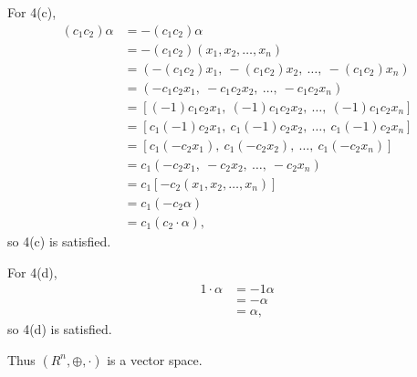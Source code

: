 \documentclass[12pt]{article}
\begin{document}
\begin{enumerate}
    For 4(c),
    \begin{align*}
      (c_1c_2)\alpha &= -(c_1c_2)\alpha\\
                     &= -(c_1c_2)(x_1,x_2,\ldots,x_n)\\
                     &= (-(c_1c_2)x_1,\ -(c_1c_2)x_2,\ \ldots,\ -(c_1c_2)x_n)\\
                     &= (-c_1c_2x_1,\ -c_1c_2x_2,\ \ldots,\ -c_1c_2x_n)\\
                     &= [(-1)c_1c_2x_1,\ (-1)c_1c_2x_2,\ \ldots,\ (-1)c_1c_2x_n]\\
                     &= [c_1(-1)c_2x_1,\ c_1(-1)c_2x_2,\ \ldots,\ c_1(-1)c_2x_n]\\
                     &= [c_1(-c_2x_1),\ c_1(-c_2x_2),\ \ldots,\ c_1(-c_2x_n)]\\
                     &= c_1(-c_2x_1,\ -c_2x_2,\ \ldots,\ -c_2x_n)\\
                     &= c_1[-c_2(x_1,x_2,\ldots,x_n)]\\
                     &= c_1(-c_2\alpha)\\
                     &= c_1(c_2 \cdot \alpha),
    \end{align*}
    so 4(c) is satisfied.

    For 4(d),
    \begin{align*}
      1 \cdot \alpha &= -1\alpha\\
                     &= -\alpha\\
                     &= \alpha,
    \end{align*}
    so 4(d) is satisfied.

    Thus $(R^{n},\oplus,\cdot)$ is a vector space.
\end{enumerate}
\end{document}
